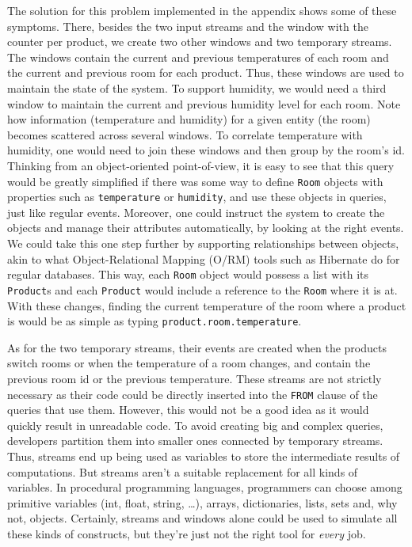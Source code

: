 The solution for this problem implemented in the appendix shows some
of these symptoms. There, besides the two input streams and the window
with the counter per product, we create two other windows and two
temporary streams. The windows contain the current and previous
temperatures of each room and the current and previous room for each
product. Thus, these windows are used to maintain the state of the
system. To support humidity, we would need a third window to maintain
the current and previous humidity level for each room. Note how
information (temperature and humidity) for a given entity (the room)
becomes scattered across several windows. To correlate temperature
with humidity, one would need to join these windows and then group by
the room's id. Thinking from an object-oriented point-of-view, it is
easy to see that this query would be greatly simplified if there was
some way to define \verb=Room= objects with properties such as
\verb=temperature= or \verb=humidity=, and use these objects in
queries, just like regular events. Moreover, one could instruct the
system to create the objects and manage their attributes
automatically, by looking at the right events. We could take this one
step further by supporting relationships between objects, akin to what
Object-Relational Mapping (O/RM) tools such as Hibernate
\cite{hibernate:www} do for regular databases. This way, each
\verb=Room= object would possess a list with its \verb=Product=s and
each \verb=Product= would include a reference to the \verb=Room= where
it is at. With these changes, finding the current temperature of the
room where a product is would be as simple as typing
\verb=product.room.temperature=.


As for the two temporary streams, their events are created when the
products switch rooms or when the temperature of a room changes, and
contain the previous room id or the previous temperature. These
streams are not strictly necessary as their code could be directly
inserted into the \verb=FROM= clause of the queries that use
them. However, this would not be a good idea as it would quickly
result in unreadable code. To avoid creating big and complex queries,
developers partition them into smaller ones connected by temporary
streams. Thus, streams end up being used as variables to store the
intermediate results of computations. But streams aren't a suitable
replacement for all kinds of variables. In procedural programming
languages, programmers can choose among primitive variables (int,
float, string, \dots), arrays, dictionaries, lists, sets and, why not,
objects. Certainly, streams and windows alone could be used to
simulate all these kinds of constructs, but they're just not the right
tool for \emph{every} job.


